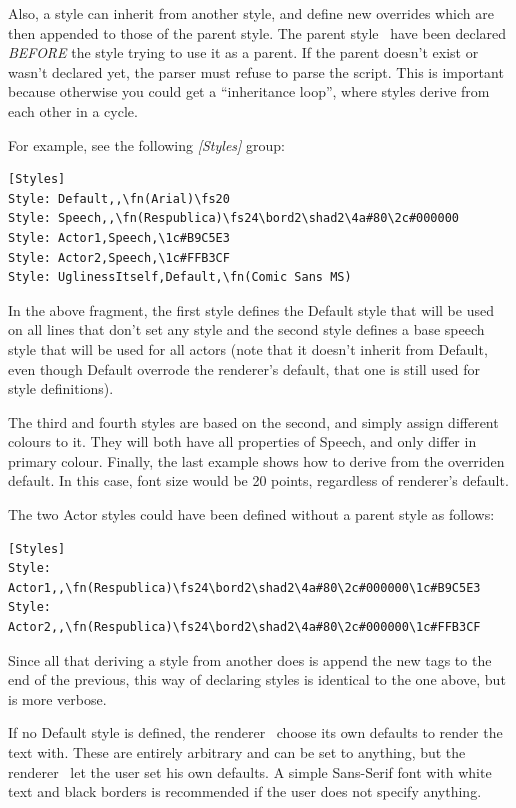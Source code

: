 \documentclass{spec}
\begin{document}
Also, a style can inherit from another style, and define new overrides which are then appended to those
of the parent style. The parent style \must\ have been declared \emph{BEFORE} the style trying to use
it as a parent. If the parent doesn't exist or wasn't declared yet, the parser must refuse to parse the
script. This is important because otherwise you could get a ``inheritance loop'', where styles derive from
each other in a cycle.

For example, see the following \emph{[Styles]} group:

\begin{verbatim}
[Styles]
Style: Default,,\fn(Arial)\fs20
Style: Speech,,\fn(Respublica)\fs24\bord2\shad2\4a#80\2c#000000
Style: Actor1,Speech,\1c#B9C5E3
Style: Actor2,Speech,\1c#FFB3CF
Style: UglinessItself,Default,\fn(Comic Sans MS)
\end{verbatim}

In the above fragment, the first style defines the Default style that will be used on all lines that
don't set any style and the second style defines a base speech style that will be used for all actors
(note that it doesn't inherit from Default, even though Default overrode the renderer's default, that
one is still used for style definitions).

The third and fourth styles are based on the second, and simply assign different colours to it. They
will both have all properties of Speech, and only differ in primary colour. Finally, the last example
shows how to derive from the overriden default. In this case, font size would be 20 points, regardless
of renderer's default.

The two Actor styles could have been defined without a parent style as follows:

\begin{verbatim}
[Styles]
Style: Actor1,,\fn(Respublica)\fs24\bord2\shad2\4a#80\2c#000000\1c#B9C5E3
Style: Actor2,,\fn(Respublica)\fs24\bord2\shad2\4a#80\2c#000000\1c#FFB3CF
\end{verbatim}

Since all that deriving a style from another does is append the new tags to the end of the previous,
this way of declaring styles is identical to the one above, but is more verbose.

If no Default style is defined, the renderer \must\ choose its own defaults to render the text with.
These are entirely arbitrary and can be set to anything, but the renderer \should\ let the user set
his own defaults. A simple Sans-Serif font with white text and black borders is recommended if the
user does not specify anything.
\end{document}
